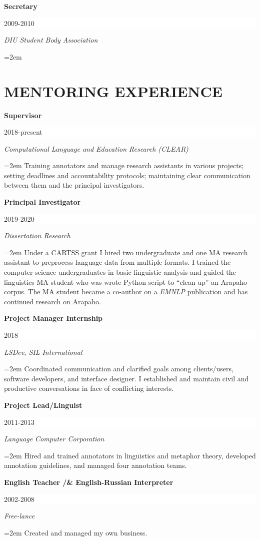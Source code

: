 \documentclass[paper=a4,fontsize=11pt]{article} %
\newcommand{\sepspace}{\vspace*{1em}}		%
\newcommand{\NewPart}[1]{\section*{\uppercase{#1}}}
\newcommand{\EducationEntry}[4]{
		\noindent \textbf{#1} \hfill      %
		\colorbox{White}{%
			\parbox{6em}{%
			\hfill\color{Black}#2}} \par  %
		\noindent \textit{#3} \par        %
		\noindent\hangindent=2em\hangafter=0 \small #4 %
		\normalsize \par}
\newcommand{\WorkEntry}[4]{				  %
		\noindent \textbf{#1} \hfill      %
		\colorbox{White}{%
			\parbox{6em}{%
			\hfill\color{Black}#2}} \par  %
		\noindent \textit{#3} \par              %
		\noindent\hangindent=2em\hangafter=0 \small #4 %
		\normalsize \par}
\begin{document}
\WorkEntry{Secretary}{2009-2010}{DIU Student Body Association}{}
\vspace{}




\NewPart{Mentoring Experience}{}

\WorkEntry{Supervisor}{2018-present}{Computational Language and Education Research (CLEAR)}{Training annotators and manage research assistants in various projects; setting deadlines and accountability protocols; maintaining clear communication between them and the principal investigators.}
\sepspace


\WorkEntry{Principal Investigator}{2019-2020}{Dissertation Research}{Under a CARTSS grant I hired two undergraduate and one MA research assistant to preprocess language data from multiple formats. I trained the computer science undergraduates in basic linguistic analysis and guided the linguistics MA student who was wrote Python script to ``clean up'' an Arapaho corpus. The MA student became a co-author on a
\textit{EMNLP} 
publication and has continued research on Arapaho.}
\sepspace

\WorkEntry{Project Manager Internship}{2018}{LSDev, SIL International}{Coordinated communication and clarified goals among clients/users, software developers, and interface designer. I established and maintain civil and productive conversations in face of conflicting interests.}
\sepspace

\WorkEntry{Project Lead/Linguist}{2011-2013}{Language Computer Corporation}{Hired and trained annotators in linguistics and metaphor theory, developed annotation guidelines, and managed four annotation teams.}
\sepspace

\WorkEntry{English Teacher /& English-Russian Interpreter}{2002-2008}{Free-lance}{Created and managed my own business.}
\end{document}
